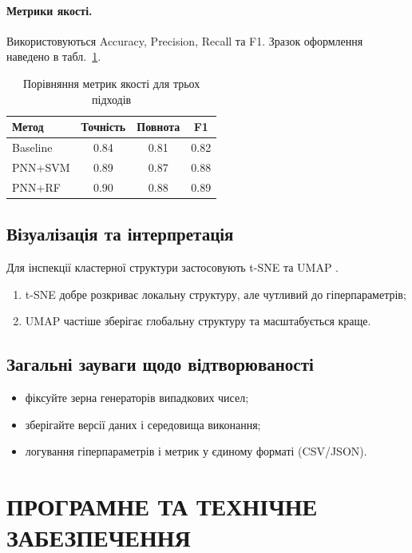 \documentclass{article}
\begin{document}
\paragraph{Метрики якості.}
Використовуються Accuracy, Precision, Recall та F1. Зразок оформлення наведено в табл.~\ref{tab:metrics}.
\begin{table}[htbp]
  \caption{Порівняння метрик якості для трьох підходів}
  \label{tab:metrics}
  \centering
  \begin{tabular}{lccc}
    \hline
    Метод    & Точність & Повнота & F1   \\
    \hline
    Baseline & 0.84     & 0.81    & 0.82 \\
    PNN+SVM  & 0.89     & 0.87    & 0.88 \\
    PNN+RF   & 0.90     & 0.88    & 0.89 \\
    \hline
  \end{tabular}
\end{table}

\subsection{Візуалізація та інтерпретація}
Для інспекції кластерної структури застосовують t-SNE \cite{tsne2008} та UMAP \cite{umap2018}.
\begin{enumerate}
  \item t-SNE добре розкриває локальну структуру, але чутливий до гіперпараметрів;
  \item UMAP частіше зберігає глобальну структуру та масштабується краще.
\end{enumerate}

\subsection{Загальні зауваги щодо відтворюваності}
\begin{itemize}
  \item фіксуйте зерна генераторів випадкових чисел;
  \item зберігайте версії даних і середовища виконання;
  \item логування гіперпараметрів і метрик у єдиному форматі (CSV/JSON).
\end{itemize}

\section{ПРОГРАМНЕ ТА ТЕХНІЧНЕ ЗАБЕЗПЕЧЕННЯ}
\end{document}
